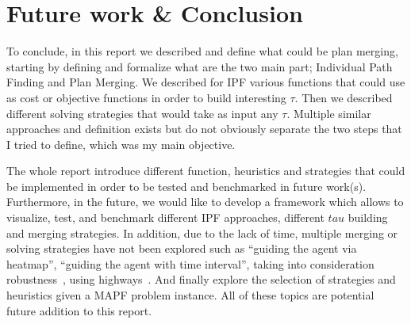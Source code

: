 \section{Future work \& Conclusion}

To conclude, in this report we described and define what could be plan merging, starting by defining and formalize what are the two main part; Individual Path Finding and Plan Merging. We described for IPF various functions that could use as cost or objective functions in order to build interesting \(\tau\). Then we described different solving strategies that would take as input any \(\tau\). Multiple similar approaches and definition \cite{komenda2013repair,lichhadapeko22a} exists but do not obviously separate the two steps that I tried to define, which was my main objective.  

The whole report introduce different function, heuristics and strategies that could be implemented in order to be tested and benchmarked in future work(s). Furthermore, in the future, we would like to develop a framework which allows to visualize, test, and benchmark different IPF approaches, different \(tau\) building and merging strategies. 
In addition, due to the lack of time, multiple merging or solving strategies have not been explored such as ``guiding the agent via heatmap'', ``guiding the agent with time interval''\cite{phli11a,naphli12a}, taking into consideration robustness~\cite{atstfewabazh20a,atstfestko20a}, using highways~\cite{coko16a,courkuxuayko16a}. And finally explore the selection of strategies and heuristics given a MAPF problem instance. All of these topics are potential future addition to this report.